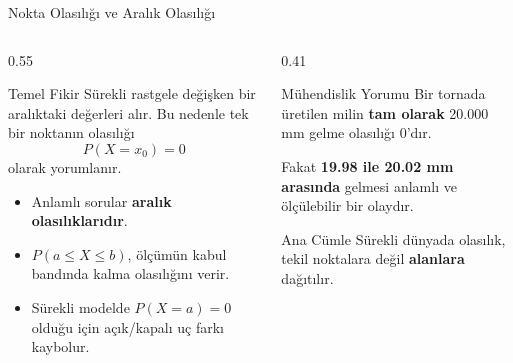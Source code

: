 \documentclass[light]{lutbeamer}
\begin{document}
\begin{frame}{Nokta Olasılığı ve Aralık Olasılığı}
\small
\begin{columns}[T,onlytextwidth]
    \begin{column}{0.55\textwidth}
        \begin{block}{Temel Fikir}
            Sürekli rastgele değişken bir aralıktaki değerleri alır. Bu nedenle tek bir noktanın olasılığı
            \[
            P(X=x_0)=0
            \]
            olarak yorumlanır.
        \end{block}

        \begin{itemize}
            \item Anlamlı sorular \textbf{aralık olasılıklarıdır}.
            \item $P(a \le X \le b)$, ölçümün kabul bandında kalma olasılığını verir.
            \item Sürekli modelde $P(X=a)=0$ olduğu için açık/kapalı uç farkı kaybolur.
        \end{itemize}
    \end{column}
    \begin{column}{0.41\textwidth}
        \begin{exampleblock}{Mühendislik Yorumu}
            Bir tornada üretilen milin \textbf{tam olarak} 20.000 mm gelme olasılığı 0'dır.

            \vspace{0.15cm}
            Fakat \textbf{19.98 ile 20.02 mm arasında} gelmesi anlamlı ve ölçülebilir bir olaydır.
        \end{exampleblock}

        \begin{alertblock}{Ana Cümle}
            Sürekli dünyada olasılık, tekil noktalara değil \textbf{alanlara} dağıtılır.
        \end{alertblock}
    \end{column}
\end{columns}
\end{frame}
\end{document}
